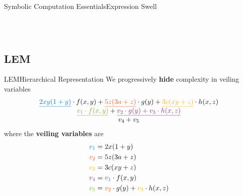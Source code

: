 \begin{frame}{Symbolic Computation Essentials}{Expression Swell}
{{\begin{tabular}{cc}
  \end{tabular}}} \\[0.5em]
\end{frame}

\subsection{\acl{LEM}}

\begin{frame}{\acl{LEM}}{Hierarchical Representation}
  We progressively \textbf{hide} complexity in veiling variables
  \begin{equation*}
    \begin{array}{c}
      \textcolor{mycolor1}{\underline{2xy(1+y)}} \cdot f(x,y) + \textcolor{mycolor2}{\underline{5z(3a+z)}} \cdot g(y) + \textcolor{mycolor3}{\underline{3c(xy+z)}} \cdot h(x,z) \\[0.1em]
      \textcolor{mycolor5}{\underline{v_1 \cdot f(x,y)}} + \textcolor{mycolor4}{\underline{v_2 \cdot g(y) + v_3 \cdot h(x,z)}} \\[0.1em]
      v_4 + v_5
    \end{array}
  \end{equation*}
  where the \textbf{veiling variables} are
  \begin{align*}
    \textcolor{mycolor1}{v_1} &= 2x(1+y) \\
    \textcolor{mycolor2}{v_2} &= 5z(3a+z) \\
    \textcolor{mycolor3}{v_3} &= 3c(xy+z) \\
    \textcolor{mycolor4}{v_4} &= \textcolor{mycolor1}{v_1} \cdot f(x,y) \\
    \textcolor{mycolor5}{v_5} &= \textcolor{mycolor2}{v_2} \cdot g(y) + \textcolor{mycolor3}{v_3} \cdot h(x,z)
  \end{align*}
\end{frame}

